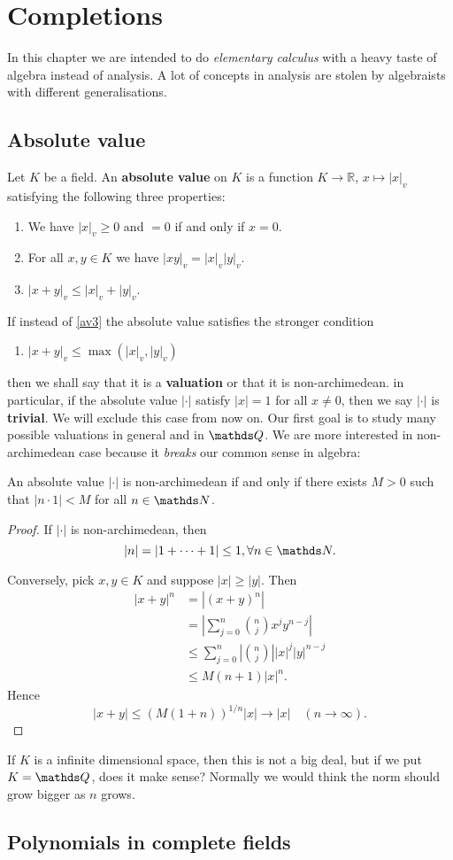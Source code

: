 \chapter{Completions}
	In this chapter we are intended to do \textit{elementary calculus} with a heavy taste of algebra instead of analysis. A lot of concepts in analysis are stolen by algebraists with different generalisations.
	\section{Absolute value}
		Let $K$ be a field. An \textbf{absolute value} on $K$ is a function $K \to \mathbb{R}$, $x \mapsto |x|_v$ satisfying the following three properties:
		\begin{enumerate}[start=1,label={\bfseries AV \arabic*}]
			\item We have $|x|_v \ge 0$ and $=0$ if and only if $x = 0$.
			\item For all $x,y \in K$ we have $|xy|_v = |x|_v|y|_v$.
			\item $|x+y|_v \le |x|_v + |y|_v$. \label{av3}
		\end{enumerate}
	
		If instead of \ref{av3} the absolute value satisfies the stronger condition
		\begin{enumerate}[start=4,label={\bfseries AV \arabic*}]
			\item $|x+y|_v \le \max(|x|_v,|y|_v)$
		\end{enumerate}
		then we shall say that it is a \textbf{valuation} or that it is non-archimedean. in particular, if the absolute value $|\cdot|$ satisfy $|x|=1$ for all $x \ne 0$, then we say $|\cdot|$ is \textbf{trivial}. We will exclude this case from now on. Our first goal is to study many possible valuations in general and in $\Q$. We are more interested in non-archimedean case because it \textit{breaks} our common sense in algebra:
		\begin{theorem}
			An absolute value $|\cdot|$ is non-archimedean if and only if there exists $M>0$ such that $|n \cdot 1|<M$ for all $n \in \N$.
		\end{theorem}
		\begin{proof}
			If $|\cdot|$ is non-archimedean, then
			\[
				|n| = |1+\cdots+1| \le 1, \forall n \in \N.
			\]
			
			Conversely, pick $x,y \in K$ and suppose $|x| \ge |y|$. Then
			\[
				\begin{aligned}
					|x+y|^n &= |(x+y)^n| \\
							&= \left|\sum_{j=0}^{n}{n \choose j}x^jy^{n-j}\right| \\
							&\le \sum_{j=0}^{n}\left|{n \choose j} \right||x|^j|y|^{n-j} \\
							&\le M(n+1)|x|^n.
				\end{aligned}
			\]
			Hence
			\[
				|x+y| \le \left(M(1+n)\right)^{1/n}|x| \to |x| \quad (n \to \infty).
			\]
		\end{proof}
		If $K$ is a infinite dimensional space, then this is not a big deal, but if we put $K=\Q$, does it make sense? Normally we would think the norm should grow bigger as $n$ grows.
	
	\section{Polynomials in complete fields}